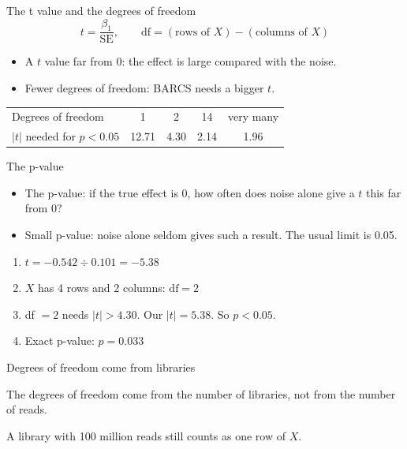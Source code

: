 \documentclass[aspectratio=169,11pt]{beamer}
\begin{document}
\begin{frame}{The t value and the degrees of freedom}
\[
t = \frac{\beta_1}{\text{SE}}, \qquad
\text{df} = (\text{rows of } X) - (\text{columns of } X)
\]
\begin{itemize}
\item A $t$ value far from 0: the effect is large compared with the noise.
\item Fewer degrees of freedom: BARCS needs a bigger $t$.
\end{itemize}
\begin{center}
\begin{tabular}{lcccc}
\toprule
Degrees of freedom & 1 & 2 & 14 & very many\\
$|t|$ needed for $p < 0.05$ & 12.71 & 4.30 & 2.14 & 1.96\\
\bottomrule
\end{tabular}
\end{center}
\end{frame}

\begin{frame}{The p-value}
\begin{itemize}
\item The \alert{p-value}: if the true effect is 0, how often does noise
  alone give a $t$ this far from 0?
\item Small p-value: noise alone seldom gives such a result. The usual limit
  is 0.05.
\end{itemize}
\begin{worked}
\small
\begin{enumerate}
\item $t = -0.542 \div 0.101 = -5.38$
\item $X$ has 4 rows and 2 columns: $\text{df} = 2$
\item df $= 2$ needs $|t| > 4.30$. Our $|t| = 5.38$. So $p < 0.05$.
\item Exact p-value: $p = 0.033$
\end{enumerate}
\end{worked}
\end{frame}

\begin{frame}{Degrees of freedom come from libraries}
\begin{remember}
The degrees of freedom come from the number of libraries, not from the
number of reads.

A library with 100 million reads still counts as one row of $X$.
\end{remember}
\end{frame}
\end{document}
